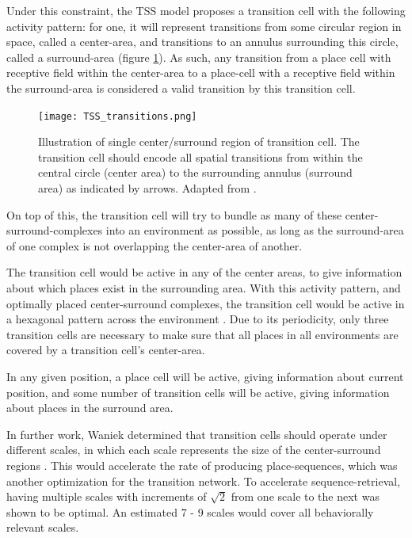 \documentclass{article}
\begin{document}
    Under this constraint, the TSS model proposes a transition cell with the following activity pattern: for one, it will represent transitions from some circular region in space, called a center-area, and transitions to an annulus surrounding this circle, called a surround-area (figure \ref{TSS_transitions}). As such, any transition from a place cell with receptive field within the center-area to a place-cell with a receptive field within the surround-area is considered a valid transition by this transition cell.

    \begin{figure}
        \centering
        \vspace*{-0.1\linewidth}
        \texttt{[image: TSS\_transitions.png]}
        \vspace*{-0.15\linewidth}
        \caption{Illustration of single center/surround region of transition cell. The transition cell should encode all spatial transitions from within the central circle (center area) to the surrounding annulus (surround area) as indicated by arrows. Adapted from \cite{Waniek2023}.}
        \label{TSS_transitions}
    \end{figure}

    On top of this, the transition cell will try to bundle as many of these center-surround-complexes into an environment as possible, as long as the surround-area of one complex is not overlapping the center-area of another.

    The transition cell would be active in any of the center areas, to give information about which places exist in the surrounding area. With this activity pattern, and optimally placed center-surround complexes, the transition cell would be active in a hexagonal pattern across the environment \parencite{Waniek2018,Kunsch2005}. Due to its periodicity, only three transition cells are necessary to make sure that all places in all environments are covered by a transition cell's center-area. 
    
    In any given position, a place cell will be active, giving information about current position, and some number of transition cells will be active, giving information about places in the surround area.

    In further work, Waniek determined that transition cells should operate under different scales, in which each scale represents the size of the center-surround regions \parencite{Waniek2020}. This would accelerate the rate of producing place-sequences, which was another optimization for the transition network. To accelerate sequence-retrieval, having multiple scales with increments of \(\sqrt{2}\) from one scale to the next was shown to be optimal. An estimated 7 - 9 scales would cover all behaviorally relevant scales.
\end{document}
